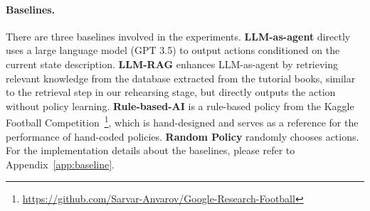 
\paragraph{Baselines.} There are three baselines involved in the experiments. \textbf{LLM-as-agent} directly uses a large language model (GPT 3.5) to output actions conditioned on the current state description. \textbf{LLM-RAG} enhances LLM-as-agent by retrieving relevant knowledge from the database extracted from the tutorial books, similar to the retrieval step in our rehearsing stage, but directly outputs the action without policy learning. \textbf{Rule-based-AI} is a rule-based policy from the Kaggle Football Competition~\citep{anvarov2020football}\footnote{\url{https://github.com/Sarvar-Anvarov/Google-Research-Football}}, which is hand-designed and serves as a reference for the performance of hand-coded policies. \textbf{Random Policy} randomly chooses actions. For the implementation details about the baselines, please refer to Appendix~\ref{app:baseline}.



